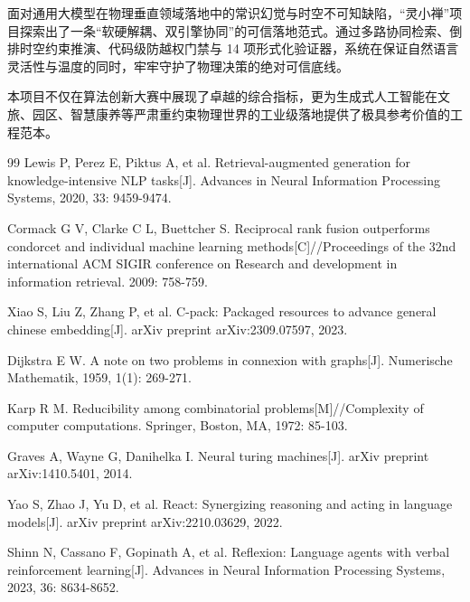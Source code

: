 \documentclass[11pt,a4paper]{ctexart}
\begin{document}
面对通用大模型在物理垂直领域落地中的常识幻觉与时空不可知缺陷，“灵小禅”项目探索出了一条“软硬解耦、双引擎协同”的可信落地范式。通过多路协同检索、倒排时空约束推演、代码级防越权门禁与 14 项形式化验证器，系统在保证自然语言灵活性与温度的同时，牢牢守护了物理决策的绝对可信底线。

本项目不仅在算法创新大赛中展现了卓越的综合指标，更为生成式人工智能在文旅、园区、智慧康养等严肃重约束物理世界的工业级落地提供了极具参考价值的工程范本。

\begin{thebibliography}{99}
Lewis P, Perez E, Piktus A, et al. Retrieval-augmented generation for knowledge-intensive NLP tasks[J]. Advances in Neural Information Processing Systems, 2020, 33: 9459-9474.

Cormack G V, Clarke C L, Buettcher S. Reciprocal rank fusion outperforms condorcet and individual machine learning methods[C]//Proceedings of the 32nd international ACM SIGIR conference on Research and development in information retrieval. 2009: 758-759.

Xiao S, Liu Z, Zhang P, et al. C-pack: Packaged resources to advance general chinese embedding[J]. arXiv preprint arXiv:2309.07597, 2023.

Dijkstra E W. A note on two problems in connexion with graphs[J]. Numerische Mathematik, 1959, 1(1): 269-271.

Karp R M. Reducibility among combinatorial problems[M]//Complexity of computer computations. Springer, Boston, MA, 1972: 85-103.

Graves A, Wayne G, Danihelka I. Neural turing machines[J]. arXiv preprint arXiv:1410.5401, 2014.

Yao S, Zhao J, Yu D, et al. React: Synergizing reasoning and acting in language models[J]. arXiv preprint arXiv:2210.03629, 2022.

Shinn N, Cassano F, Gopinath A, et al. Reflexion: Language agents with verbal reinforcement learning[J]. Advances in Neural Information Processing Systems, 2023, 36: 8634-8652.
\end{thebibliography}
\end{document}
